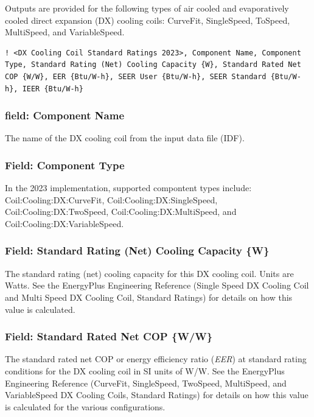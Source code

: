 Outputs are provided for the following types of air cooled and evaporatively cooled direct expansion (DX) cooling coils: CurveFit, SingleSpeed, ToSpeed, MultiSpeed, and VariableSpeed.

\begin{lstlisting}
! <DX Cooling Coil Standard Ratings 2023>, Component Name, Component Type, Standard Rating (Net) Cooling Capacity {W}, Standard Rated Net COP {W/W}, EER {Btu/W-h}, SEER User {Btu/W-h}, SEER Standard {Btu/W-h}, IEER {Btu/W-h}
\end{lstlisting}

\subsubsection{field: Component Name}\label{field-component-name-5}

The name of the DX cooling coil from the input data file (IDF).

\subsubsection{Field: Component Type}\label{field-component-type-5}

In the 2023 implementation, supported compontent types include: Coil:Cooling:DX:CurveFit, Coil:Cooling:DX:SingleSpeed, Coil:Cooling:DX:TwoSpeed, Coil:Cooling:DX:MultiSpeed, and Coil:Cooling:DX:VariableSpeed.

\subsubsection{Field: Standard Rating (Net) Cooling Capacity \{W\}}

The standard rating (net) cooling capacity for this DX cooling coil. Units are Watts. See the EnergyPlus Engineering Reference (Single Speed DX Cooling Coil and Multi Speed DX Cooling Coil, Standard Ratings) for details on how this value is calculated.

\subsubsection{Field: Standard Rated Net COP \{W/W\}}

The standard rated net COP or energy efficiency ratio (\emph{EER}) at standard rating conditions for the DX cooling coil in SI units of W/W. See the EnergyPlus Engineering Reference (CurveFit, SingleSpeed, TwoSpeed, MultiSpeed, and VariableSpeed DX Cooling Coils, Standard Ratings) for details on how this value is calculated for the various configurations.

